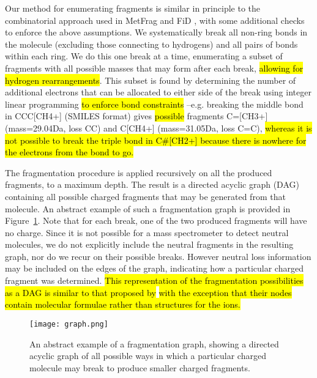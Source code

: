 Our method for enumerating fragments is similar in principle to the combinatorial approach used in MetFrag and FiD \citep{Wolf2010, Kokkonen2008}, with some additional checks to enforce the above assumptions.  
We systematically break all non-ring bonds in the molecule (excluding those connecting to hydrogens) and all pairs of bonds within each ring. We do this one break at a time, enumerating a subset of fragments with all possible masses that may form after each break, \hl{allowing for hydrogen rearrangements}. This subset is found by determining the number of additional electrons that can be allocated to either side of the break using integer linear programming \hl{to enforce bond constraints} --e.g. breaking the middle bond in CCC[CH4+] (SMILES format) gives \hl{possible} fragments C=[CH3+] (mass=29.04Da, loss CC) and C[CH4+] (mass=31.05Da, loss C=C), \hl{whereas it is not possible to break the triple bond in C\#[CH2+] because there is nowhere for the electrons from the bond to go.}

The fragmentation procedure is applied recursively on all the produced fragments, to a maximum depth. 
The result is a directed acyclic graph (DAG) containing all possible charged fragments that may be generated from that molecule. 
An abstract example of such a fragmentation graph is provided in Figure~\ref{fig:fragmentationgraph}. 
Note that for each break, one of the two produced fragments will have no charge. Since it is not possible for a mass spectrometer to detect neutral molecules, 
we do not explicitly include the neutral fragments in the resulting graph, nor do we recur on their possible breaks. 
However neutral loss information may be included on the edges of the graph, indicating how a particular charged fragment was determined.
\hl{This representation of the fragmentation possibilities as a DAG is similar to that proposed by} \citet{Bocker2008} \hl{with the exception that their nodes contain molecular formulae rather than structures for the ions.}

\begin{figure}
\begin{center}
\texttt{[image: graph.png]}
\end{center}
\caption{An abstract example of a fragmentation graph, showing a directed acyclic graph of all possible ways in which a particular charged molecule may break to produce smaller charged fragments.}
\label{fig:fragmentationgraph}
\vspace{-1em}
\end{figure}


